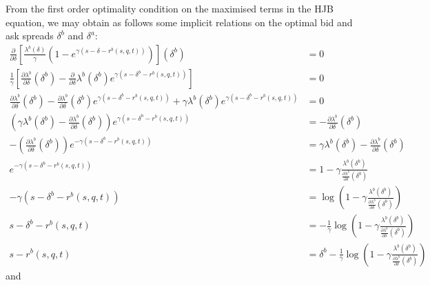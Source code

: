 From the first order optimality condition on the maximised terms in the HJB equation, we may obtain as follows some implicit relations
on the optimal bid and ask spreads $\delta^b$ and $\delta^a$:
\begin{align*}
    \frac{\partial}{\partial\delta}\left[\frac{\lambda^b(\delta)}{\gamma}(1-e^{\gamma(s-\delta-r^b(s,q,t))})\right](\delta^b)&=0\\
    \frac{1}{\gamma}\left[\frac{\partial\lambda^b}{\partial\delta}(\delta^b)-\frac{\partial}{\partial\delta}\lambda^b(\delta^b)e^{\gamma(s-\delta^b-r^b(s,q,t))}\right]&=0\\
    \frac{\partial\lambda^b}{\partial\delta}(\delta^b)-\frac{\partial\lambda^b}{\partial\delta}(\delta^b)e^{\gamma(s-\delta^b-r^b(s,q,t))}+\gamma\lambda^b(\delta^b)e^{\gamma(s-\delta^b-r^b(s,q,t))}&=0\\
    \left(\gamma\lambda^b(\delta^b)-\frac{\partial\lambda^b}{\partial\delta}(\delta^b)\right)e^{\gamma(s-\delta^b-r^b(s,q,t))}&=-\frac{\partial\lambda^b}{\partial\delta}(\delta^b)\\
    -\left(\frac{\partial\lambda^b}{\partial\delta}(\delta^b)\right)e^{-\gamma(s-\delta^b-r^b(s,q,t))}&=\gamma\lambda^b(\delta^b)-\frac{\partial\lambda^b}{\partial\delta}(\delta^b)\\
    e^{-\gamma(s-\delta^b-r^b(s,q,t))}&=1-\gamma\frac{\lambda^b(\delta^b)}{\frac{\partial\lambda^b}{\partial\delta}(\delta^b)}\\
    -\gamma(s-\delta^b-r^b(s,q,t))&=\log\left(1-\gamma\frac{\lambda^b(\delta^b)}{\frac{\partial\lambda^b}{\partial\delta}(\delta^b)}\right)\\
    s-\delta^b-r^b(s,q,t)&=-\frac{1}{\gamma}\log\left(1-\gamma\frac{\lambda^b(\delta^b)}{\frac{\partial\lambda^b}{\partial\delta}(\delta^b)}\right)\\
    s-r^b(s,q,t)&=\delta^b-\frac{1}{\gamma}\log\left(1-\gamma\frac{\lambda^b(\delta^b)}{\frac{\partial\lambda^b}{\partial\delta}(\delta^b)}\right)
\end{align*}
and
